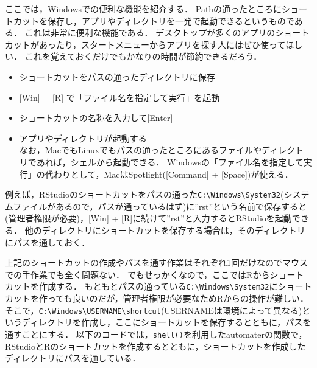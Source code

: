 \documentclass[
]{article}
\providecommand{\tightlist}{%
  \setlength{\itemsep}{0pt}\setlength{\parskip}{0pt}}
\begin{document}
ここでは，Windowsでの便利な機能を紹介する．
Pathの通ったところにショートカットを保存し，アプリやディレクトリを一発で起動できるというものである．
これは非常に便利な機能である．
デスクトップが多くのアプリのショートカットがあったり，スタートメニューからアプリを探す人にはぜひ使ってほしい．
これを覚えておくだけでもかなりの時間が節約できるだろう．

\begin{itemize}
\tightlist
\item
  ショートカットをパスの通ったディレクトリに保存\\
\item
  {[}Win{]} + {[}R{]} で「ファイル名を指定して実行」を起動\\
\item
  ショートカットの名称を入力して{[}Enter{]}\\
\item
  アプリやディレクトリが起動する\\
  なお，MacでもLinuxでもパスの通ったところにあるファイルやディレクトリであれば，シェルから起動できる．
  Windowsの「ファイル名を指定して実行」の代わりとして，MacはSpotlight({[}Command{]} + {[}Space{]})が使える．
\end{itemize}

例えば，RStudioのショートカットをパスの通った\texttt{C:\textbackslash{}Windows\textbackslash{}System32}(システムファイルがあるので，パスが通っているはず)に''rst''という名前で保存すると(管理者権限が必要)，{[}Win{]} + {[}R{]}に続けて''rst''と入力するとRStudioを起動できる．
他のディレクトリにショートカットを保存する場合は，そのディレクトリにパスを通しておく．

上記のショートカットの作成やパスを通す作業はそれぞれ1回だけなのでマウスでの手作業でも全く問題ない．
でもせっかくなので，ここではRからショートカットを作成する．
もともとパスの通っている\texttt{C:\textbackslash{}Windows\textbackslash{}System32}にショートカットを作っても良いのだが，管理者権限が必要なためRからの操作が難しい．
そこで，\texttt{C:\textbackslash{}Windows\textbackslash{}USERNAME\textbackslash{}shortcut}(USERNAMEは環境によって異なる)というディレクトリを作成し，ここにショートカットを保存するとともに，パスを通すことにする．
以下のコードでは，\texttt{shell()}を利用したautomaterの関数で，RStudioとRのショートカットを作成するとともに，ショートカットを作成したディレクトリにパスを通している．
\end{document}
